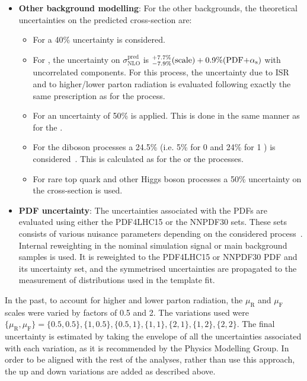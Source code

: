 \begin{itemize}
	\item \textbf{Other background modelling}:	   For the other backgrounds, the theoretical uncertainties on 
		the predicted cross-section are:
		\begin{itemize}
			\item For \Wjets a 40\% uncertainty is considered.
			\item For \tZq, the uncertainty on $\sigma^{\text{pred}}_{\text{NLO}}$ is 
			 $^{+7.7\%}_{-7.9\%}(\text{scale})+0.9\%(\text{PDF+\ensuremath{\alpha_{\text{s}}}})$ with uncorrelated components. 
			For this process, the uncertainty due to ISR and to higher/lower parton radiation is evaluated 
			following exactly the same prescription as for the \tchannel process.
			\item For \tWZ an uncertainty of 50\% is applied. This is done in the same manner as for the \Zjets.
			\item For the diboson processes a 24.5\% (i.e. 5\% for 0 \bjets and 24\% for 1 \bjets) 
			is considered~\cite{Berends:1991}. This is calculated as for the \Zjets or the \tWZ processes.
			\item For rare top quark and other Higgs boson processes a 50\% uncertainty on the cross-section is used. 
		\end{itemize}


	\item \textbf{PDF uncertainty}:  The uncertainties associated with the PDFs are evaluated using 
		either the PDF4LHC15 or the NNPDF30 sets. These sets consists of various nuisance parameters 
		depending on the considered process~\cite{Butterworth:2015oua}.
		Internal reweighting in the nominal simulation signal or main background samples is used. 
		It is reweighted to the PDF4LHC15 or NNPDF30 PDF and its uncertainty set, and the symmetrised 
		uncertainties are propagated to the measurement of distributions used in the template fit.


\end{itemize}

In the past, to account for higher and lower parton radiation, the $\mu_{\text{R}}$ and $\mu_{\text{F}}$ scales were varied 
by factors of 0.5 and 2. The variations used were $\{\mu_{\text{R}}, \mu_{\text{F}}\} = \{0.5,0.5\}, \{1,0.5\}, \{0.5,1\}, \{1,1\}, \{2,1\}, \{1,2\}, \{2,2\}$. 
The final uncertainty is estimated by taking the envelope of all the uncertainties associated with 
each variation, as it is recommended by the Physics Modelling 
Group. %
In order to be aligned with the rest of the analyses, rather than use this approach, the up and down variations are added as
described above.

